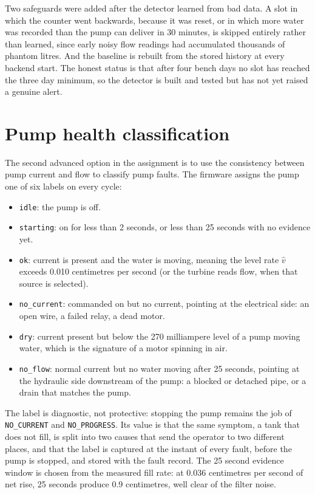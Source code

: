 Two safeguards were added after the detector learned from bad data. A slot in which the counter went backwards, because it was reset, or in which more water was recorded than the pump can deliver in 30 minutes, is skipped entirely rather than learned, since early noisy flow readings had accumulated thousands of phantom litres. And the baseline is rebuilt from the stored history at every backend start. The honest status is that after four bench days no slot has reached the three day minimum, so the detector is built and tested but has not yet raised a genuine alert.

\section{Pump health classification}
\label{sec:o6-7}

The second advanced option in the assignment is to use the consistency between pump current and flow to classify pump faults. The firmware assigns the pump one of six labels on every cycle:

\begin{itemize}
\item \texttt{idle}: the pump is off.
\item \texttt{starting}: on for less than 2 seconds, or less than 25 seconds with no evidence yet.
\item \texttt{ok}: current is present and the water is moving, meaning the level rate $\hat{v}$ exceeds 0.010 centimetres per second (or the turbine reads flow, when that source is selected).
\item \texttt{no\_current}: commanded on but no current, pointing at the electrical side: an open wire, a failed relay, a dead motor.
\item \texttt{dry}: current present but below the 270 milliampere level of a pump moving water, which is the signature of a motor spinning in air.
\item \texttt{no\_flow}: normal current but no water moving after 25 seconds, pointing at the hydraulic side downstream of the pump: a blocked or detached pipe, or a drain that matches the pump.
\end{itemize}

The label is diagnostic, not protective: stopping the pump remains the job of \texttt{NO\_CURRENT} and \texttt{NO\_PROGRESS}. Its value is that the same symptom, a tank that does not fill, is split into two causes that send the operator to two different places, and that the label is captured at the instant of every fault, before the pump is stopped, and stored with the fault record. The 25 second evidence window is chosen from the measured fill rate: at 0.036 centimetres per second of net rise, 25 seconds produce 0.9 centimetres, well clear of the filter noise.
